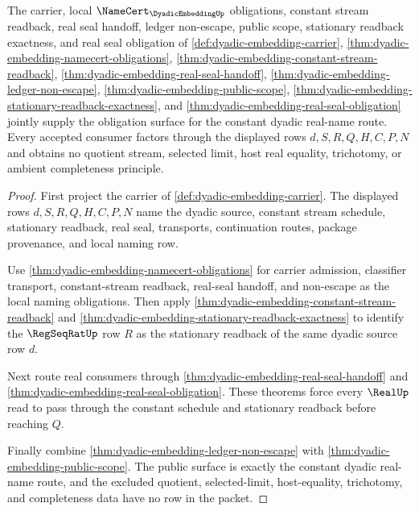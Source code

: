 \begin{theorem}
\label{thm:dyadic-embedding-obligation-closure-surface}
The carrier, local $\NameCert_{\DyadicEmbeddingUp}$ obligations, constant stream readback, real seal handoff, ledger non-escape, public scope, stationary readback exactness, and real seal obligation of \autoref{def:dyadic-embedding-carrier}, \autoref{thm:dyadic-embedding-namecert-obligations}, \autoref{thm:dyadic-embedding-constant-stream-readback}, \autoref{thm:dyadic-embedding-real-seal-handoff}, \autoref{thm:dyadic-embedding-ledger-non-escape}, \autoref{thm:dyadic-embedding-public-scope}, \autoref{thm:dyadic-embedding-stationary-readback-exactness}, and \autoref{thm:dyadic-embedding-real-seal-obligation} jointly supply the obligation surface for the constant dyadic real-name route. Every accepted consumer factors through the displayed rows $d,S,R,Q,H,C,P,N$ and obtains no quotient stream, selected limit, host real equality, trichotomy, or ambient completeness principle.
\end{theorem}
\begin{proof}
First project the carrier of \autoref{def:dyadic-embedding-carrier}. The displayed rows $d,S,R,Q,H,C,P,N$ name the dyadic source, constant stream schedule, stationary readback, real seal, transports, continuation routes, package provenance, and local naming row.

Use \autoref{thm:dyadic-embedding-namecert-obligations} for carrier admission, classifier transport, constant-stream readback, real-seal handoff, and non-escape as the local naming obligations. Then apply \autoref{thm:dyadic-embedding-constant-stream-readback} and \autoref{thm:dyadic-embedding-stationary-readback-exactness} to identify the $\RegSeqRatUp$ row $R$ as the stationary readback of the same dyadic source row $d$.

Next route real consumers through \autoref{thm:dyadic-embedding-real-seal-handoff} and \autoref{thm:dyadic-embedding-real-seal-obligation}. These theorems force every $\RealUp$ read to pass through the constant schedule and stationary readback before reaching $Q$.

Finally combine \autoref{thm:dyadic-embedding-ledger-non-escape} with \autoref{thm:dyadic-embedding-public-scope}. The public surface is exactly the constant dyadic real-name route, and the excluded quotient, selected-limit, host-equality, trichotomy, and completeness data have no row in the packet.
\end{proof}

